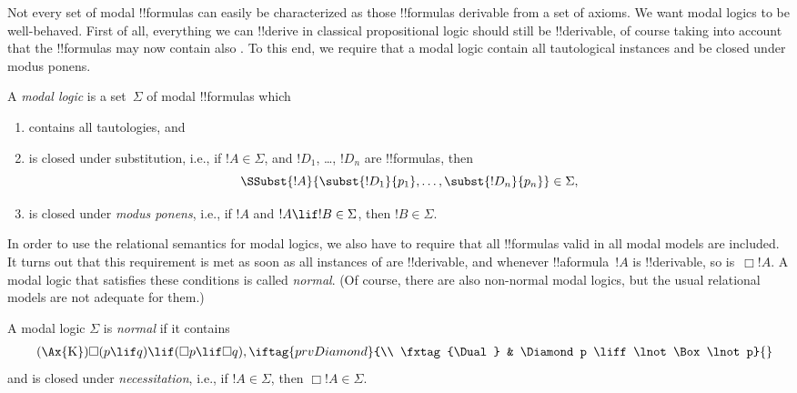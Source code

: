\documentclass[../../../include/open-logic-section]{subfiles}
\begin{document}

Not every set of modal !!{formula}s can easily be characterized as
those !!{formula}s derivable from a set of axioms. We want modal
logics to be well-behaved. First of all, everything we can !!{derive}
in classical propositional logic should still be !!{derivable}, of
course taking into account that the !!{formula}s may now contain also
. To this end, we
require that a modal logic contain all tautological instances and be
closed under modus ponens.

\begin{defn}
  A \emph{modal logic} is a set~$\Sigma$ of modal !!{formula}s which
  \begin{enumerate}
  \item contains all tautologies, and
  \item is closed under substitution, i.e., if $!A \in \Sigma$, and
    $!D_1$, \dots, $!D_n$ are !!{formula}s, then
    \[
    \SSubst{!A}{\subst{!D_1}{p_1}, \dots, \subst{!D_n}{p_n}} \in \Sigma,
    \]
    \item is closed under \emph{modus ponens}, i.e., if $!A$ and $!A
      \lif !B \in \Sigma$, then $!B \in \Sigma$.
  \end{enumerate}
\end{defn}

In order to use the relational semantics for modal logics, we also
have to require that all !!{formula}s valid in all modal models are
included. It turns out that this requirement is met as soon as all
instances of  are
!!{derivable}, and whenever !!a{formula}~$!A$ is !!{derivable}, so
is~$\Box !A$. A modal logic that satisfies these conditions is called
\emph{normal}. (Of course, there are also non-normal modal logics, but
the usual relational models are not adequate for them.)

\begin{defn}
  A modal logic $\Sigma$ is \emph{normal} if it contains
  \begin{align*}
    \tag{\Ax{K}} & \Box(p \lif q) \lif (\Box p \lif \Box q),
    \iftag{prvDiamond}{\\
      \tag{\Dual} & \Diamond p \liff \lnot\Box\lnot p}{}
  \end{align*}
  and is closed under \emph{necessitation}, i.e., if $!A \in
  \Sigma$, then $\Box !A \in \Sigma$.
\end{defn}
\end{document}
